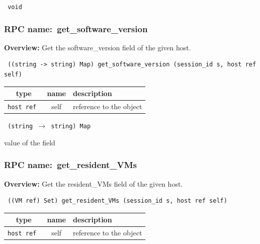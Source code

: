 \vspace{0.3cm}

{\tt 
void
}



\vspace{0.3cm}
\vspace{0.3cm}
\vspace{0.3cm}
\subsubsection{RPC name:~get\_software\_version}

{\bf Overview:} 
Get the software\_version field of the given host.

\begin{verbatim} ((string -> string) Map) get_software_version (session_id s, host ref self)\end{verbatim}



 
\vspace{0.3cm}
\begin{tabular}{|c|c|p{7cm}|}
 \hline
{\bf type} & {\bf name} & {\bf description} \\ \hline
{\tt host ref } & self & reference to the object \\ \hline 

\end{tabular}

\vspace{0.3cm}

{\tt 
(string $\rightarrow$ string) Map
}


value of the field
\vspace{0.3cm}
\vspace{0.3cm}
\vspace{0.3cm}
\subsubsection{RPC name:~get\_resident\_VMs}

{\bf Overview:} 
Get the resident\_VMs field of the given host.

\begin{verbatim} ((VM ref) Set) get_resident_VMs (session_id s, host ref self)\end{verbatim}



 
\vspace{0.3cm}
\begin{tabular}{|c|c|p{7cm}|}
 \hline
{\bf type} & {\bf name} & {\bf description} \\ \hline
{\tt host ref } & self & reference to the object \\ \hline 

\end{tabular}

